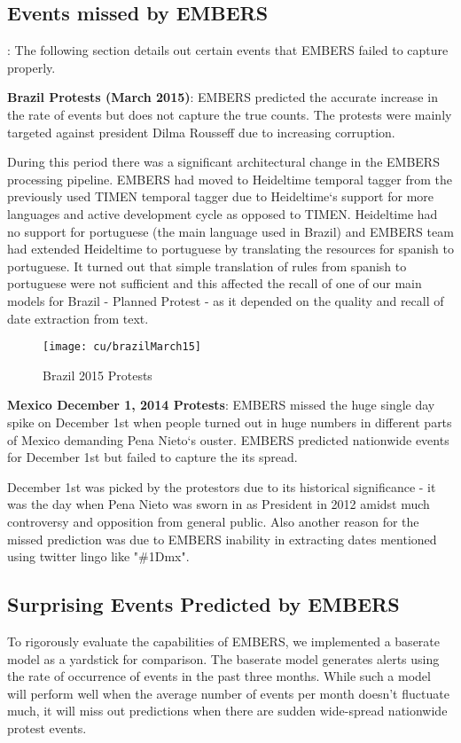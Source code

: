 \subsection{Events missed by EMBERS}:
The following section details out certain events that EMBERS failed to
capture properly.

\textbf{Brazil Protests (March 2015)}: EMBERS predicted the accurate
increase in the rate of events but does not capture the true counts. The
protests were mainly targeted against president Dilma Rousseff due to
increasing corruption. 

During this period there was a significant architectural change in the
EMBERS processing pipeline. EMBERS had moved to Heideltime temporal
tagger from the previously used TIMEN temporal tagger due to
Heideltime`s support for more languages and active development cycle as
opposed to TIMEN. Heideltime had no support for portuguese (the main
language used in Brazil) and EMBERS team had extended Heideltime to
portuguese by translating the resources for spanish to portuguese. It
turned out that simple translation of rules from spanish to portuguese
were not sufficient and this affected the recall of one of our main
models for Brazil - Planned Protest - as it depended on the quality and recall of
date extraction from text.

\begin{figure}[H]
\centering
\texttt{[image: cu/brazilMarch15]}
\caption{Brazil 2015 Protests}
\label{fig:brazilSpring}
\end{figure}


\textbf{Mexico December 1, 2014 Protests}:
EMBERS missed the huge single day spike on December 1st when
people turned out in huge numbers in different parts of Mexico demanding
Pena Nieto`s ouster.
EMBERS predicted nationwide events for December 1st but failed to
capture the its spread. 

December 1st was picked by the protestors due to
its historical significance - it was the day when Pena Nieto was sworn
in as President in 2012 amidst much controversy and opposition from
general public. Also another reason for the missed prediction was due to 
EMBERS inability in extracting dates mentioned using twitter lingo  like "\#1Dmx".

\subsection{Surprising Events Predicted by EMBERS}To rigorously evaluate the capabilities of EMBERS, we implemented a baserate model as a yardstick for comparison. The baserate model generates alerts using the rate of occurrence of events in the past three months. While such a model will perform well when the average number of events per month doesn't fluctuate much, it will miss out predictions when there are sudden wide-spread nationwide protest events. 


